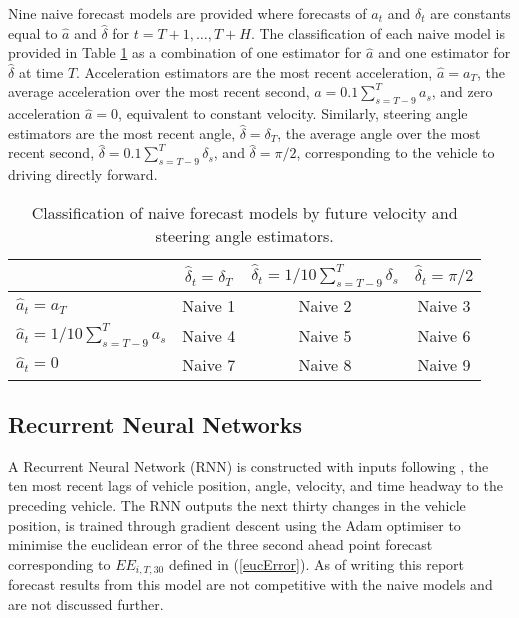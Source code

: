 \documentclass[12pt,a4paper]{article}\usepackage[]{graphicx}\usepackage[]{color}
\begin{document}
Nine naive forecast models are provided where forecasts of $a_t$ and $\delta_t$ are constants equal to $\hat{a}$ and $\hat{\delta}$ for $t = T+1, \dots, T+H$. The classification of each naive model is provided in Table \ref{tableNaive} as a combination of one estimator for $\hat{a}$ and one estimator for $\hat{\delta}$ at time $T$. Acceleration estimators are the most recent acceleration, $\hat{a} = a_T$, the average acceleration over the most recent second, $\hat{a} = 0.1 \sum_{s = T-9}^T a_s$, and zero acceleration $\hat{a} = 0$, equivalent to constant velocity. Similarly, steering angle estimators are the most recent angle, $\hat{\delta} = \delta_T$, the average angle over the most recent second, $\hat{\delta} = 0.1 \sum_{s = T - 9}^T \delta_s$, and $\hat{\delta} = \pi/2$, corresponding to the vehicle to driving directly forward.
\begin{table}
\begin{center}
\begin{tabular}{|l|c|c|c|}
\hline
& $\hat{\delta}_t = \delta_T$ & $\hat{\delta}_t = 1/10 \sum_{s=T-9}^T \delta_s$ & $\hat{\delta}_t = \pi/2$ \\
\hline
$\hat{a}_t = a_T$ & Naive 1 & Naive 2 & Naive 3 \\
$\hat{a}_t = 1/10\sum_{s=T-9}^T a_s$ & Naive 4 & Naive 5 & Naive 6\\
$\hat{a}_t = 0$ & Naive 7 & Naive 8 & Naive 9 \\
\hline
\end{tabular}
\end{center}
\caption{Classification of naive forecast models by future velocity and steering angle estimators.}
\label{tableNaive}
\end{table}

\subsection{Recurrent Neural Networks}
\label{subsec:RNN}
A Recurrent Neural Network (RNN) is constructed with inputs following \citet{Ding2013}, the ten most recent lags of vehicle position, angle, velocity, and time headway to the preceding vehicle. The RNN outputs the next thirty changes in the vehicle position, is trained through gradient descent using the Adam optimiser to minimise the euclidean error of the three second ahead point forecast corresponding to $EE_{i, T, 30}$ defined in (\ref{eucError}). As of writing this report forecast results from this model are not competitive with the naive models and are not discussed further.
\end{document}

